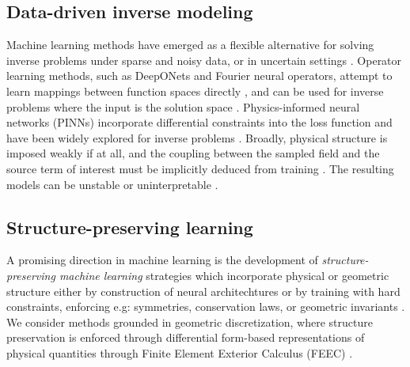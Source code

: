 \documentclass[onefignum,onetabnum]{siamart171218} %
\def\hyph{-\penalty0\hskip0pt\relax}
\begin{document}
\subsection{Data-driven inverse modeling}
\label{sec:background_inverse}

Machine learning methods have emerged as a flexible alternative for solving inverse problems under sparse and noisy data, or in uncertain settings \cite{de2022deep, mishra2022estimates, kamyab2022deep, vesselinov2018contaminant, kontos2022machine, reiter2017machine}. 
Operator learning methods, such as DeepONets and Fourier neural operators, attempt to learn mappings between function spaces directly \cite{li2020fourier, lu2021learning}, and can be used for inverse problems where the input is the solution space \cite{molinaro2023neural}.
Physics-informed neural networks (PINNs) incorporate differential constraints into the loss function \cite{raissi2019physics} and have been widely explored for inverse problems \cite{yu2022gradient, jagtap2022physics}.
Broadly, physical structure is imposed weakly if at all, and the coupling between the sampled field and the source term of interest must be implicitly deduced from training \cite{karniadakis2021physics, wang2023physics, cai2021physics}.
The resulting models can be unstable or uninterpretable \cite{wang2021understanding, jiang2024structure}.


\subsection{Structure-preserving learning}
\label{sec:background_ml}
A promising direction in machine learning is the development of \emph{structure\hyph preserving machine learning} strategies which incorporate physical or geometric structure either by construction of neural architechtures or by training with hard constraints, enforcing e.g: symmetries, conservation laws, or geometric invariants \cite{greydanus2019hamiltonian, cohen2016group, brandstetter2022clifford, chen2021neural, hernandez2021structure, patel2022thermodynamically}.
We consider methods grounded in geometric discretization, where structure preservation is enforced through differential form-based representations of physical quantities through Finite Element Exterior Calculus (FEEC) \cite{arnold2006finite}.
\end{document}
